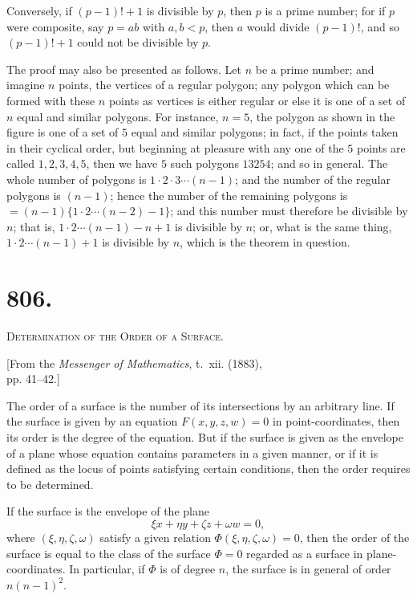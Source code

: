 \documentclass[11pt,a4paper]{book}
\begin{document}
Conversely, if $(p-1)! + 1$ is divisible by $p$, then $p$ is a prime number; for if $p$ were composite, say $p = ab$ with $a, b < p$, then $a$ would divide $(p-1)!$, and so $(p-1)! + 1$ could not be divisible by $p$.

The proof may also be presented as follows. Let $n$ be a prime number; and imagine $n$ points, the vertices of a regular polygon; any polygon which can be formed with these $n$ points as vertices is either regular or else it is one of a set of $n$ equal and similar polygons. For instance, $n = 5$, the polygon as shown in the figure is one of a set of $5$ equal and similar polygons; in fact, if the points taken in their cyclical order, but beginning at pleasure with any one of the $5$ points are called $1, 2, 3, 4, 5$, then we have $5$ such polygons $13254$; and so in general. The whole number of polygons is $1 \cdot 2 \cdot 3 \cdots (n-1)$; and the number of the regular polygons is $(n-1)$; hence the number of the remaining polygons is $= (n - 1) \{1 \cdot 2 \cdots (n-2) - 1\}$; and this number must therefore be divisible by $n$; that is, $1 \cdot 2 \cdots (n-1) - n + 1$ is divisible by $n$; or, what is the same thing, $1 \cdot 2 \cdots (n-1) + 1$ is divisible by $n$, which is the theorem in question.



\newpage
\section*{806.}
\begin{center}
{\large\scshape Determination of the Order of a Surface.}
\end{center}

\begin{flushright}
\small[From the \textit{Messenger of Mathematics}, t.~xii. (1883),\\
pp. 41--42.]
\end{flushright}

The order of a surface is the number of its intersections by an arbitrary line. If the surface is given by an equation $F(x, y, z, w) = 0$ in point-coordinates, then its order is the degree of the equation. But if the surface is given as the envelope of a plane whose equation contains parameters in a given manner, or if it is defined as the locus of points satisfying certain conditions, then the order requires to be determined.

If the surface is the envelope of the plane
\[
\xi x + \eta y + \zeta z + \omega w = 0,
\]
where $(\xi, \eta, \zeta, \omega)$ satisfy a given relation $\Phi(\xi, \eta, \zeta, \omega) = 0$, then the order of the surface is equal to the class of the surface $\Phi = 0$ regarded as a surface in plane-coordinates. In particular, if $\Phi$ is of degree $n$, the surface is in general of order $n(n-1)^2$.
\end{document}

